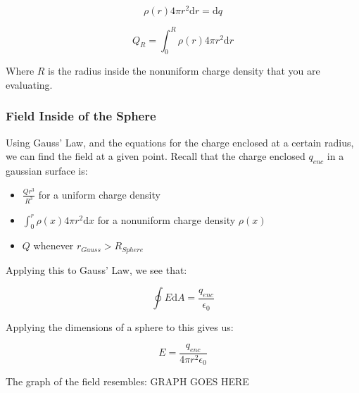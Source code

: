 \documentclass[a4paper,12pt]{article}
\begin{document}
							\begin{equation*}
									\rho(r) 4 \pi r^{2} \mathrm{d}r = \mathrm{d}q
							\end{equation*}

							\begin{equation*}
									Q_{R} = \int_{0}^{R} \rho(r) 4 \pi r^{2} \mathrm{d}r 
							\end{equation*}

							Where $R$ is the radius inside the nonuniform charge density that you are evaluating.

						\subsubsection{Field Inside of the Sphere}
							Using Gauss' Law, and the equations for the charge enclosed at a certain radius, we can find the field at a given point. Recall that the charge enclosed $q_{enc}$ in a gaussian surface is:
							\begin{itemize}
									\item $\frac{Qr^{3}}{R^{3}}$ for a uniform charge density
									\item $\int_{0}^{r} \rho(x) 4 \pi r^{2} \mathrm{d}x$ for a nonuniform charge density $\rho(x)$ 
									\item $Q$ whenever $r_{Gauss} > R_{Sphere}$
							\end{itemize}
							
							Applying this to Gauss' Law, we see that:

							\begin{equation*}
									\oint E \mathrm{d}A = \frac{q_{enc}}{\epsilon_{0}}
							\end{equation*}

							Applying the dimensions of a sphere to this gives us:

							\begin{equation*}
									E = \frac{q_{enc}}{4 \pi r^{2} \epsilon_{0}}
							\end{equation*}

							The graph of the field resembles:
							GRAPH GOES HERE 
\end{document}
